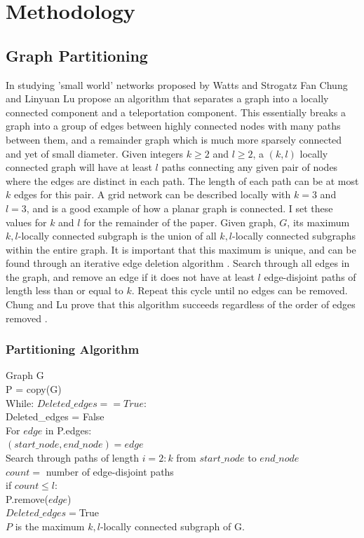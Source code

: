 \documentclass{article}
\begin{document}
\section{Methodology}
\subsection{Graph Partitioning}
In studying 'small world' networks proposed by Watts and Strogatz \cite{Watts:1998} Fan Chung and Linyuan Lu propose an algorithm that separates a graph into a locally connected component and a teleportation component. This essentially breaks a graph into a group of edges between highly connected nodes with many paths between them, and a remainder graph which is much more sparsely
connected and yet of small diameter. Given integers $k \geq 2$ and $l \geq 2$, a $(k,l)$ locally connected graph will have at least $l$ paths connecting any given pair of nodes where the edges are distinct in each path. The length of each path can be at most $k$ edges for this pair. A grid network can be described locally with $k=3$ and $l=3$, and is a good example of how a planar graph is connected. I set these values for $k$ and $l$ for the remainder of the paper. Given graph, $G$, its maximum $k,l$-locally connected subgraph is the union of all $k,l$-locally connected subgraphs within the entire graph. It is important that this maximum is unique, and can be found through an iterative edge deletion algorithm \cite{Chung:2004}. Search through all edges in the graph, and remove an edge if it does not have at least $l$ edge-disjoint paths of length less than or equal to $k$. Repeat this cycle until no edges can be removed. Chung and Lu prove that this algorithm succeeds regardless of the order of edges removed \cite{Chung:2004}.

\subsubsection{Partitioning Algorithm}
\begin{spacing}{1}
Graph G\\
P = copy(G)\\
While: $Deleted\_edges == True$:\\
\indent Deleted\_edges = False\\
\indent For $edge$ in P.edges:\\
\indent \indent $(start\_node, end\_node) = edge$\\
\indent \indent Search through paths of length $i=2:k$ from $start\_node$ to $end\_node$\\
\indent \indent $count =$  number of edge-disjoint paths\\
\indent \indent if $count \leq l$:\\
\indent \indent \indent P.remove($edge$)\\
\indent \indent \indent $Deleted\_edges = $True\\
$P$ is the maximum $k,l$-locally connected subgraph of G.
\end{spacing}	
\end{document}
